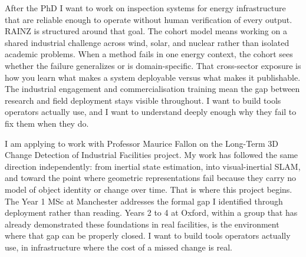 \documentclass[11pt,a4paper]{article}
\begin{document}
After the PhD I want to work on inspection systems for energy
infrastructure that are reliable enough to operate without human
verification of every output. RAINZ is structured around that goal. The cohort model means working on a shared industrial challenge across wind, solar, and nuclear rather than isolated academic problems. When a method fails in one energy context, the cohort sees whether the failure generalizes or is domain-specific. That cross-sector exposure is how you learn what makes a system deployable versus what makes it publishable. The industrial engagement and commercialisation training mean the gap between research and field deployment stays visible throughout. I want to build tools operators actually use, and I want to understand deeply enough why they fail to fix them when they do.

I am applying to work with Professor Maurice Fallon on the Long-Term 
3D Change Detection of Industrial Facilities project. My work has 
followed the same direction independently: from inertial state 
estimation, into visual-inertial SLAM, and toward the point where 
geometric representations fail because they carry no model of object 
identity or change over time. That is where this project begins. 
The Year 1 MSc at Manchester addresses the formal gap I identified 
through deployment rather than reading. Years 2 to 4 at Oxford, 
within a group that has already demonstrated these foundations in 
real facilities, is the environment where that gap can be properly 
closed. I want to build tools operators actually use, in infrastructure 
where the cost of a missed change is real.




\end{document}
